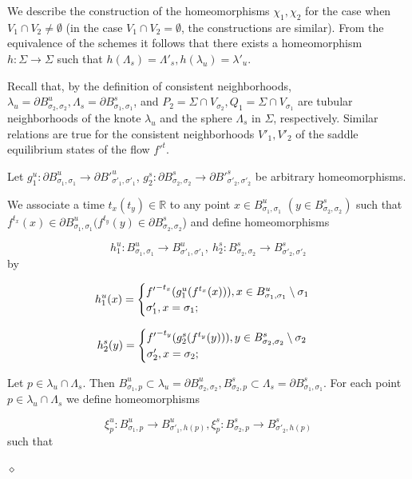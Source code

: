 \documentclass[%
 aip,
 amsmath,amssymb,
preprint,%
]{revtex4-1}
\newenvironment{proof}{{\bf Proof:}}
{\hfill $\diamond$\medskip}
\begin{document}
\begin{proof}

We describe the construction of the homeomorphisms $\chi_1, \chi_2$ for the case when $V_1\cap V_2\neq \emptyset$ (in the case $V_1\cap V_2=\emptyset$, the constructions are similar). From the equivalence of the schemes  it follows that there exists a homeomorphism $h:\Sigma\to \Sigma$ such that $h(\Lambda_s)=\Lambda'_s, h(\lambda_u)=\lambda'_u$.

Recall that, by the definition of consistent neighborhoods,
$\lambda_u=\partial B^u_{\sigma_2,\sigma_2},\Lambda_s=\partial B^s_{\sigma_1, \sigma_1}$, and $P_2=\Sigma\cap V_{\sigma_2}, Q_1=\Sigma\cap V_{\sigma_1}$ are tubular neighborhoods of the knote $\lambda_u$ and the sphere $\Lambda_s$ in $\Sigma$, respectively. Similar relations are true for the consistent neighborhoods $V'_1, V'_2$ of the saddle equilibrium states of the flow ${f'}^t$.

Let $g^u_1:\partial B^u_{\sigma_1,\sigma_1}\to \partial {B'}^u_{\sigma'_1, \sigma'_1}$, $g^s_2:\partial B^s_{\sigma_2,\sigma_2}\to \partial {B'}^s_{\sigma'_2, \sigma'_2}$ be  arbitrary homeomorphisms.

We associate a time $t_{x} (t_y)\in \mathbb R$ to any  point $x\in B^u_{\sigma_1, \sigma_1}$ $(y\in B^s_{\sigma_2,\sigma_2})$  such that $f^{t_{x}}(x)\in \partial B^u_{\sigma_1,\sigma_1} (f^{t_{y}}(y)\in \partial B^s_{\sigma_2,\sigma_2}$) and define homeomorphisms  

$$h^u_1: B^u_{\sigma_1,\sigma_1}\to B^u_{\sigma'_1,\sigma'_1},\ h^s_2: B^s_{\sigma_2,\sigma_2}\to B^s_{\sigma'_2,\sigma'_2}$$ by


$$h^u_1(x)=\begin{cases}
{f'}^{-t_{x}}(g^u_1(f^{t_{x}}(x))), x\in B^u_{\sigma_1,\sigma_1}\setminus \sigma_1 \cr
\sigma'_1, x=\sigma_1;
\end{cases}$$

$$h^s_2(y)=\begin{cases}
{f'}^{-t_{y}}(g^s_2(f^{t_{y}}(y))), y\in B^s_{\sigma_2,\sigma_2}\setminus \sigma_2\cr
\sigma'_2, x=\sigma_2;
\end{cases}$$

Let $p\in \lambda_u\cap \Lambda_s$. Then $B^u_{\sigma_1, p}\subset \lambda_u=\partial B^u_{\sigma_2,\sigma_2}, B^s_{\sigma_2, p}\subset \Lambda_s=\partial B^s_{\sigma_1,\sigma_1}$. For each point $p\in \lambda_u\cap \Lambda_s$ we define homeomorphisms

$$\xi^u_p: B^u_{\sigma_1, p}\to B^u_{\sigma'_1, h(p)}, \xi^s_p: B^s_{\sigma_2, p}\to B^s_{\sigma'_2, h(p)}$$ such that


\end{proof}
\end{document}
